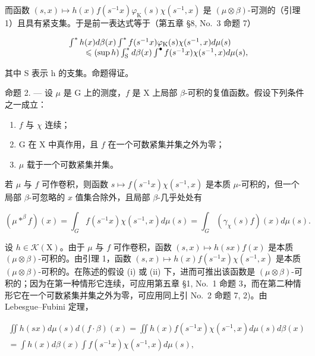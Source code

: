 而函数 \((s,x)\mapsto h(x)f(s^{-1}x)\varphi_{\mathrm{K}}(s)\chi(s^{-1},x)\) 是 \((\mu\otimes\beta)\)-可测的（引理 1）且具有紧支集。于是前一表达式等于（第五章 §8, No.~3 命题 7）

\[
\begin{array}{r l} & {\int^ {*} h (x) d \beta (x) \int^ {*} f (s ^ {- 1} x) \varphi_ {\mathrm{K}} (s) \chi (s ^ {- 1}, x) d \mu (s)} \\ & {\qquad \leqslant (\sup h) \int_ {\mathrm{S}} ^ {*} d \beta (x) \int^ {\bullet} f (s ^ {- 1} x) \chi (s ^ {- 1}, x) d \mu (s),} \end{array}
\]

其中 S 表示 h 的支集。命题得证。

命题 2. --- 设 \(\mu\) 是 G 上的测度，\(f\) 是 X 上局部 \(\beta\)-可积的复值函数。假设下列条件之一成立：

\begin{enumerate}
\def\labelenumi{(\roman{enumi})}
\item
  \(f\) 与 \(\chi\) 连续；
\item
  G 在 X 中真作用，且 \(f\) 在一个可数紧集并集之外为零；
\item
  \(\mu\) 载于一个可数紧集并集。
\end{enumerate}

若 \(\mu\) 与 \(f\) 可作卷积，则函数 \(s \mapsto f(s^{-1}x)\chi(s^{-1}, x)\) 是本质 \(\mu\)-可积的，但一个局部 \(\beta\)-可忽略的 \(x\) 值集合除外，且局部 \(\beta\)-几乎处处有

\[
(\mu * ^ {\beta} f) (x) = \int_ {G} f (s ^ {- 1} x) \chi (s ^ {- 1}, x) d \mu (s) = \int_ {G} (\gamma_ {\chi} (s) f) (x) d \mu (s).\tag{3}
\]

设 \(h \in \mathcal{K}(\mathrm{X})\)。由于 \(\mu\) 与 \(f\) 可作卷积，函数 \((s, x) \mapsto h(sx)f(x)\) 是本质 \((\mu \otimes \beta)\)-可积的。由引理 1，函数 \((s, x) \mapsto h(x)f(s^{-1}x)\chi(s^{-1}, x)\) 是本质 \((\mu \otimes \beta)\)-可积的。在陈述的假设 (i) 或 (ii) 下，进而可推出该函数是 \((\mu \otimes \beta)\)-可积的；因为在第一种情形它连续，可应用第五章 §1, No.~1 命题 3，而在第二种情形它在一个可数紧集并集之外为零，可应用同上引 No.~2 命题 7, 2)。由 Lebesgue--Fubini 定理，

\[
\begin{array}{c} \iint h (s x) d \mu (s) d (f \cdot \beta) (x) = \iint h (x) f (s ^ {- 1} x) \chi (s ^ {- 1}, x) d \mu (s) d \beta (x) \\ = \int h (x) d \beta (x) \int f (s ^ {- 1} x) \chi (s ^ {- 1}, x) d \mu (s), \end{array}
\]

